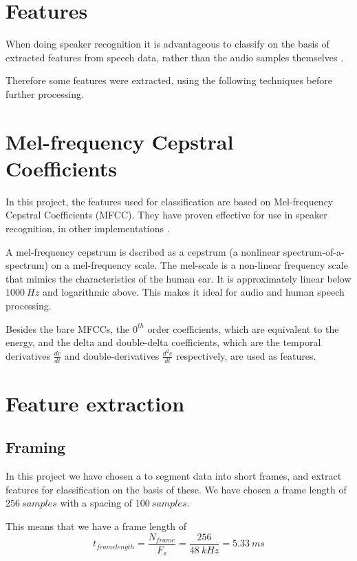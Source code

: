 \section{Features}

When doing speaker recognition it is advantageous to classify on the basis of extracted features from speech data, rather than the audio samples themselves \cite{Springer:36}.

Therefore some features were extracted, using the following techniques before further processing.

\section{Mel-frequency Cepstral Coefficients}
In this project, the features used for classification are based on Mel-frequency Cepstral Coefficients (MFCC).
They have proven effective for use in speaker recognition, in other implementations \cite{Springer:36}. 

A mel-frequency cepstrum is dscribed as a cepstrum (a nonlinear spectrum-of-a-spectrum) on a mel-frequency scale.
The mel-scale is a non-linear frequency scale that mimics the characteristics of the human ear.
It is approximately linear below $ 1000\ Hz $ and logarithmic above.
This makes it ideal for audio and human speech processing.

Besides the bare MFCCs, the $ 0^{th} $ order coefficients, which are equivalent to the energy, and the delta and double-delta coefficients, which are the temporal derivatives $ \frac{dc}{dt} $ and double-derivatives $\frac{d^2c}{dt}$ respectively, are used as features.


\section{Feature extraction}
\subsection{Framing}
In this project we have chosen a to segment data into short frames, and extract features for classification on the basis of these.
We have chosen a frame length of $ 256\ samples $ with a spacing of $ 100\ samples $.

This means that we have a frame length of
\begin{equation}
t_{frame length} = \dfrac{N_{frame}}{F_s} = \dfrac{256}{48\ kHz} = 5.33\ ms
\end{equation}

